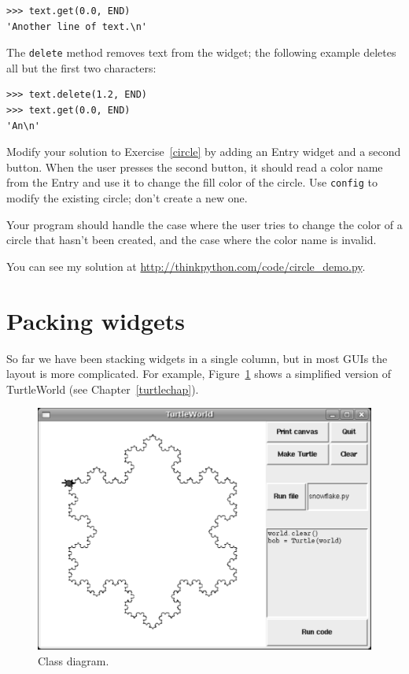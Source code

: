 \documentclass[10pt]{book}
\begin{document}
\begin{CJK}{UTF8}{gbsn}
\begin{verbatim}
>>> text.get(0.0, END)
'Another line of text.\n'
\end{verbatim}
%
The {\tt delete} method removes text from the widget;
the following example deletes all but the first two characters:

\begin{verbatim}
>>> text.delete(1.2, END)
>>> text.get(0.0, END)
'An\n'
\end{verbatim}
%

\begin{exercise}
\label{circle2}

Modify your solution to Exercise~\ref{circle} by adding an
Entry widget and a second button.  When the user presses the
second button, it should read a color name from the Entry and
use it to change the fill color of the circle.  Use {\tt config}
to modify the existing circle; don't create a new one.

Your program should handle the case where the user tries to
change the color of a circle that hasn't been created, and
the case where the color name is invalid.

You can see my solution at \url{http://thinkpython.com/code/circle_demo.py}.

\end{exercise}


\section{Packing widgets}

So far we have been stacking widgets in a single column, but in most
GUIs the layout is more complicated.  For example,
Figure~\ref{fig.turtleworld} shows a simplified version of
TurtleWorld (see Chapter~\ref{turtlechap}).

\begin{figure}
\centerline{\includegraphics[scale=0.5]{figs/TurtleWorld.pdf}}
\caption{Class diagram.}
\label{fig.turtleworld}
\end{figure}



\end{CJK}
\end{document}
